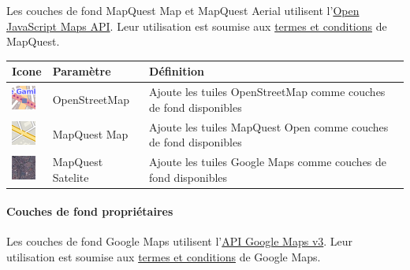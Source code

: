 \documentclass[letterpaper,10pt,french]{sphinxmanual}
\begin{document}
Les couches de fond MapQuest Map et MapQuest Aerial utilisent l'\href{https://developer.mapquest.com/web/products/open/map}{Open JavaScript Maps API}. Leur utilisation est soumise aux \href{https://developer.mapquest.com/web/products/open/map\#terms}{termes et conditions} de MapQuest.

\begin{tabulary}{\linewidth}{|L|L|L|}
\hline

\textbf{Icone}
 & 
\textbf{Paramètre}
 & 
\textbf{Définition}
\\
\hline
\includegraphics{osm-layer-icon.png}
 & 
OpenStreetMap
 & 
Ajoute les tuiles OpenStreetMap comme couches de fond disponibles
\\
\hline
\includegraphics{mqstr-layer-icon.png}
 & 
MapQuest Map
 & 
Ajoute les tuiles MapQuest Open comme couches de fond disponibles
\\
\hline
\includegraphics{mqsat-layer-icon.png}
 & 
MapQuest Satelite
 & 
Ajoute les tuiles Google Maps comme couches de fond disponibles
\\
\hline\end{tabulary}

\paragraph{Couches de fond propriétaires}

Les couches de fond Google Maps utilisent l'\href{https://developers.google.com/maps/documentation/javascript/}{API Google Maps v3}. Leur utilisation est soumise aux \href{https://developers.google.com/maps/terms/}{termes et conditions} de Google Maps.
\end{document}
